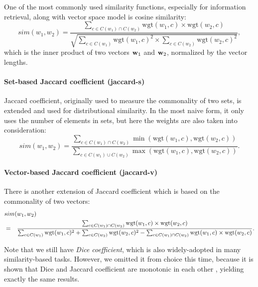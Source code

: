 \documentclass[english]{jnlp_1.4}
\begin{document}
One of the most commonly used similarity functions, especially for
information retrieval, along with vector space model is cosine
similarity:
\[
 sim(w_1, w_2) = \frac{\sum_{c \in C(w_1)\cap C(w_2)} \mbox{wgt}(w_1, c) \times \mbox{wgt}(w_2, c)}{\sqrt{\sum_{c\in C(w_1)} \mbox{wgt}(w_1, c)^2 \times \sum_{c \in C(w_2)} \mbox{wgt}(w_2, c)^2}},
\]
which is the inner product of two vectors ${\bf w}_1$ and ${\bf w}_2$,
normalized by the vector lengths.

\paragraph{Set-based Jaccard coefficient (jaccard-s)} \quad

Jaccard coefficient, originally used to measure the commonality of two
sets, is extended and used for distributional similarity. In the most
naive form, it only uses the number of elements in sets, but here the
weights are also taken into consideration:
\[
 sim(w_1, w_2) = \frac{\sum_{c \in C(w_1)\cap C(w_2)} \min(\mbox{wgt}(w_1, c), \mbox{wgt}(w_2, c))}{\sum_{c \in C(w_1)\cup C(w_2)}\max(\mbox{wgt}(w_1, c), \mbox{wgt}(w_2, c))}.
\]

\paragraph{Vector-based Jaccard coefficient (jaccard-v)} \quad

There is another extension of Jaccard coefficient which is based on
the commonality of two vectors:
\begin{eqnarray*}
  \lefteqn{sim(w_1, w_2)} \\
  & = & \frac{\sum_{c \in C(w_1)\cap C(w_2)} \mbox{wgt}(w_1, c) \times \mbox{wgt}(w_2, c)}{\sum_{c\in C(w_1)}\mbox{wgt}(w_1, c)^2 + \sum_{c\in C(w_2)}\mbox{wgt}(w_2, c)^2 -\sum_{c \in C(w_1)\cap C(w_2)} \mbox{wgt}(w_1, c) \times \mbox{wgt}(w_2, c)}.
\end{eqnarray*}

Note that we still have {\em Dice coefficient}, which is also
widely-adopted in many similarity-based tasks. However, we omitted it
from choice this time, because it is shown that Dice and Jaccard
coefficient are monotonic in each other \cite{Weeds:04}, yielding
exactly the same results.
\end{document}
